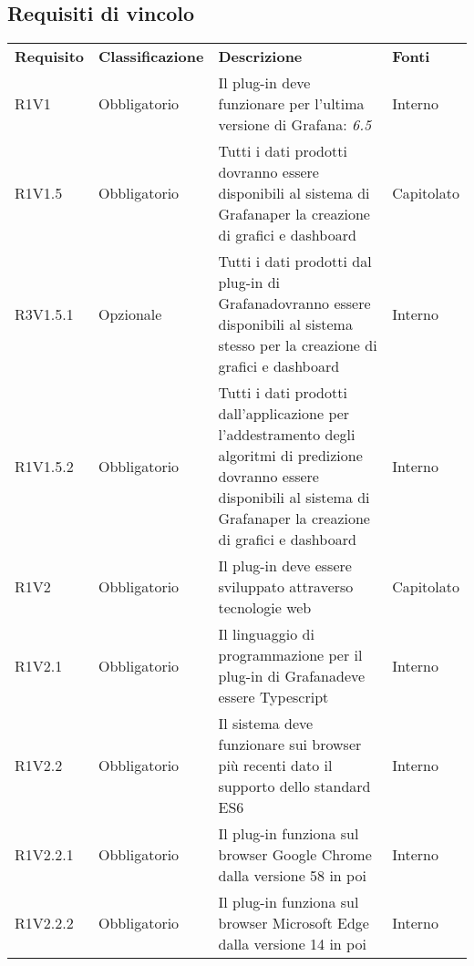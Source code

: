 \subsection{Requisiti di vincolo}
	\begin{longtable} {
		>{\centering}p{18mm} 
		>{\centering}p{28mm}
		>{}p{50mm} 
		>{}p{28mm}
		}
	\rowcolor{gray!50}
	\textbf{Requisito} & 
	\textbf{Classificazione} & 
	\textbf{Descrizione} & 
	\textbf{Fonti} 	\TBstrut \\
	
	R1V1 & 
	Obbligatorio & 
	Il plug-in deve funzionare per l'ultima versione di Grafana\glo: \textit{6.5} &
	Interno  \TBstrut \\ [2mm]		
	
	R1V1.5 &
	Obbligatorio &
	Tutti i dati prodotti dovranno essere disponibili al sistema di Grafana\glosp per la creazione di grafici e dashboard\glo &
	Capitolato  \TBstrut \\ [2mm]
	
	R3V1.5.1 &
	Opzionale &
	Tutti i dati prodotti dal plug-in di Grafana\glosp dovranno essere disponibili al sistema stesso per la creazione di grafici e dashboard\glo &
	Interno  \TBstrut \\ [2mm]
	
	R1V1.5.2 &
	Obbligatorio &
	Tutti i dati prodotti dall'applicazione per l'addestramento degli algoritmi di predizione dovranno essere disponibili al sistema di Grafana\glosp per la creazione di grafici e dashboard\glo &
	Interno  \TBstrut \\ [2mm]

	R1V2 & 
	Obbligatorio & 
	Il plug-in deve essere sviluppato attraverso tecnologie web &
	Capitolato  \TBstrut \\ [2mm]
	
	R1V2.1 & 
	Obbligatorio & 
	Il linguaggio di programmazione per il plug-in di Grafana\glosp deve essere Typescript &
	Interno  \TBstrut \\ [2mm]
	
	R1V2.2 & 
	Obbligatorio & 
	Il sistema deve funzionare sui browser più recenti dato il supporto dello standard ES6 &
	Interno  \TBstrut \\ [2mm]
	
	R1V2.2.1 & 
	Obbligatorio & 
	Il plug-in funziona sul browser Google Chrome dalla versione 58 in poi &
	Interno  \TBstrut \\ [2mm]
	
	R1V2.2.2 & 
	Obbligatorio & 
	Il plug-in funziona sul browser Microsoft Edge dalla versione 14 in poi &
	Interno  \TBstrut \\ [2mm]
	

\end{longtable}
